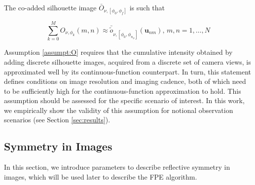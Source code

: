 \begin{assumption}
    \label{assumpt:O}
    The co-added silhouette image $\bar{O}_{\nu,[\phi_0,\phi_f]}$ is such that

    \begin{equation}
        \sum_{k=0}^M O_{\nu,\phi_k}(m,n) \approx \bar{\tilde{o}}_{\nu,[\phi_0,\phi_{n_\phi}]}(\mathbf{u}_{nm}),\, m,n = 1,\dots,N
    \end{equation}
\end{assumption}

Assumption \ref{assumpt:O} requires that the cumulative intensity obtained by adding discrete silhouette images, acquired from a discrete set of camera views, is approximated well by its continuous-function counterpart. In turn, this statement defines conditions on image resolution and imaging cadence, both of which need to be sufficiently high for the continuous-function approximation to hold. This assumption should be assessed for the specific scenario of interest. In this work, we empirically show the validity of this assumption for notional observation scenarios (see Section \ref{sec:results}).

\subsection{Symmetry in Images}

In this section, we introduce parameters to describe reflective symmetry in images, which will be used later to describe the FPE algorithm.




